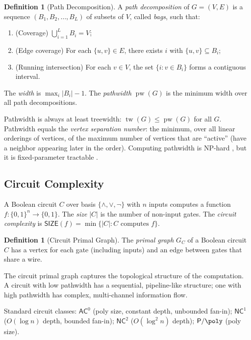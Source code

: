 \documentclass[11pt]{article}
\theoremstyle{plain}
\theoremstyle{definition}
\newtheorem{definition}[theorem]{Definition}
\newcommand{\tw}{\operatorname{tw}}
\newcommand{\pw}{\operatorname{pw}}
\newcommand{\SIZE}{\mathsf{SIZE}}
\newcommand{\Pclass}{\mathsf{P}}
\newcommand{\NC}{\mathsf{NC}}
\newcommand{\AC}{\mathsf{AC}}
\newcommand{\set}[1]{\{#1\}}
\begin{document}
\begin{definition}[Path Decomposition]\label{def:path-decomp}
A \emph{path decomposition} of $G = (V, E)$ is a sequence $(B_1, B_2, \ldots, B_L)$ of subsets of $V$, called \emph{bags}, such that:
\begin{enumerate}[label=(\roman*)]
    \item (Coverage) $\bigcup_{i=1}^L B_i = V$;
    \item (Edge coverage) For each $\set{u,v} \in E$, there exists $i$ with $\set{u,v} \subseteq B_i$;
    \item (Running intersection) For each $v \in V$, the set $\set{i : v \in B_i}$ forms a contiguous interval.
\end{enumerate}
The \emph{width} is $\max_i |B_i| - 1$. The \emph{pathwidth} $\pw(G)$ is the minimum width over all path decompositions.
\end{definition}

Pathwidth is always at least treewidth: $\tw(G) \leq \pw(G)$ for all $G$. Pathwidth equals the \emph{vertex separation number}: the minimum, over all linear orderings of vertices, of the maximum number of vertices that are ``active'' (have a neighbor appearing later in the order). Computing pathwidth is NP-hard \cite{ArnborgCP87}, but it is fixed-parameter tractable \cite{BodlaenderK93}.

\subsection{Circuit Complexity}

A Boolean circuit $C$ over basis $\set{\land, \lor, \neg}$ with $n$ inputs computes a function $f : \set{0,1}^n \to \set{0,1}$. The \emph{size} $|C|$ is the number of non-input gates. The \emph{circuit complexity} is $\SIZE(f) = \min\set{|C| : C \text{ computes } f}$.

\begin{definition}[Circuit Primal Graph]\label{def:circuit-graph}
The \emph{primal graph} $G_C$ of a Boolean circuit $C$ has a vertex for each gate (including inputs) and an edge between gates that share a wire.
\end{definition}

The circuit primal graph captures the topological structure of the computation. A circuit with low pathwidth has a sequential, pipeline-like structure; one with high pathwidth has complex, multi-channel information flow.

Standard circuit classes: $\AC^0$ (poly size, constant depth, unbounded fan-in); $\NC^1$ ($O(\log n)$ depth, bounded fan-in); $\NC^2$ ($O(\log^2 n)$ depth); $\Pclass/\poly$ (poly size).
\end{document}
